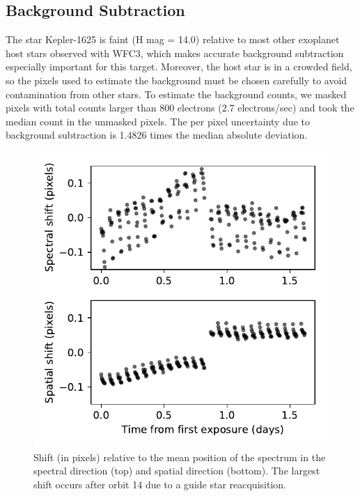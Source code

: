 \documentclass[twocolumn]{aastex62}
\begin{document}


\subsection{Background Subtraction} 
\label{sec:background} 
The star Kepler-1625 is faint (H mag = 14.0) relative to most other exoplanet host stars observed with WFC3, which makes accurate background subtraction especially important for this target. Moreover, the host star is in a crowded field, so the pixels used to estimate the background must be chosen carefully to avoid contamination from other stars.  To estimate the background counts, we masked pixels with total counts larger than 800 electrons (2.7 electrons/sec) and took the median count in the unmasked pixels. The per pixel uncertainty due to background subtraction is 1.4826 times the median absolute deviation.




\begin{figure}
\includegraphics[width = 0.5 \textwidth]{figures/fig4_shifts.pdf}
    \caption{Shift (in pixels) relative to the mean position of the spectrum in the spectral direction (top) and spatial direction (bottom). The largest shift occurs after orbit 14 due to a guide star reacquisition.}
\label{fig:shifts}
\end{figure}
\end{document}
